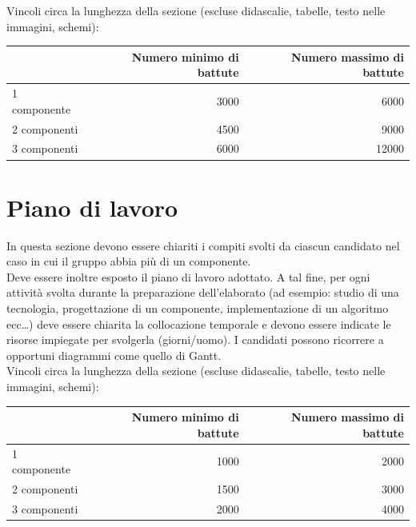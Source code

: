 \documentclass[12pt]{article}
\begin{document}
Vincoli circa la lunghezza della sezione (escluse didascalie, tabelle, testo nelle immagini, schemi):

\vspace{1cm}
\begin{tabular}{l|rr}
 & Numero minimo di battute & Numero massimo di battute \\
 \hline
 1 componente & 3000 & 6000 \\
 2 componenti & 4500 & 9000 \\
 3 componenti & 6000 & 12000 \\
 \hline
\end{tabular}


\newpage



\section{Piano di lavoro}

In questa sezione devono essere chiariti i compiti svolti da ciascun candidato nel caso in cui il gruppo abbia più di un componente.\\

Deve essere inoltre esposto il piano di lavoro adottato. A tal fine, per ogni attività svolta durante la preparazione dell'elaborato (ad esempio: studio di una tecnologia, progettazione di un componente, implementazione di un algoritmo ecc…) deve essere chiarita la collocazione temporale e devono essere indicate le risorse impiegate per svolgerla (giorni/uomo). I candidati possono ricorrere a opportuni diagrammi come quello di Gantt.\\


Vincoli circa la lunghezza della sezione (escluse didascalie, tabelle, testo nelle immagini, schemi):

\vspace{1cm}
\begin{tabular}{l|rr}
 & Numero minimo di battute & Numero massimo di battute \\
 \hline
 1 componente & 1000 & 2000 \\
 2 componenti & 1500 & 3000 \\
 3 componenti & 2000 & 4000 \\
 \hline
\end{tabular}
\end{document}
